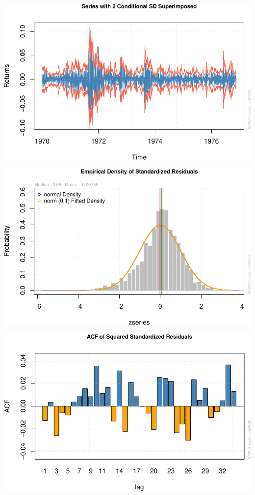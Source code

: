 \documentclass[]{elsarticle} %
\makeatletter
\def\maxwidth{\ifdim\Gin@nat@width>\linewidth\linewidth
\else\Gin@nat@width\fi}
\let\Oldincludegraphics\includegraphics
\renewcommand{\includegraphics}[1]{\Oldincludegraphics[width=\maxwidth]{#1}}
\makeatother
\begin{document}
\includegraphics{report_files/figure-latex/analysis201-1.pdf}

\includegraphics{report_files/figure-latex/analysis20df1-1.pdf}

\includegraphics{report_files/figure-latex/analysis2031-1.pdf}
\end{document}
